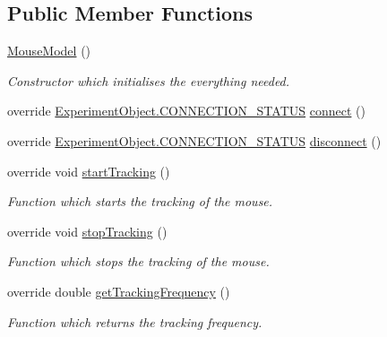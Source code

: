 \subsection*{Public Member Functions}
\begin{DoxyCompactItemize}
\item 
\hyperlink{class_web_analyzer_1_1_test_1_1_communication_1_1_mouse_model_ad84f4a65000f2e03f7003546d5e63dd2}{Mouse\+Model} ()
\begin{DoxyCompactList}\small\item\em Constructor which initialises the everything needed. \end{DoxyCompactList}\item 
override \hyperlink{class_web_analyzer_1_1_u_i_1_1_interaction_objects_1_1_experiment_object_a2875208b4f4b0ed643593152f4ec025c}{Experiment\+Object.\+C\+O\+N\+N\+E\+C\+T\+I\+O\+N\+\_\+\+S\+T\+A\+T\+U\+S} \hyperlink{class_web_analyzer_1_1_test_1_1_communication_1_1_mouse_model_a147d911ce601efe3bf779cebaed106e9}{connect} ()
\item 
override \hyperlink{class_web_analyzer_1_1_u_i_1_1_interaction_objects_1_1_experiment_object_a2875208b4f4b0ed643593152f4ec025c}{Experiment\+Object.\+C\+O\+N\+N\+E\+C\+T\+I\+O\+N\+\_\+\+S\+T\+A\+T\+U\+S} \hyperlink{class_web_analyzer_1_1_test_1_1_communication_1_1_mouse_model_a7928a4615bb62b6e4b273340bd224554}{disconnect} ()
\item 
override void \hyperlink{class_web_analyzer_1_1_test_1_1_communication_1_1_mouse_model_ad2d20d7f2f302ef22e40da86a18dcaf9}{start\+Tracking} ()
\begin{DoxyCompactList}\small\item\em Function which starts the tracking of the mouse. \end{DoxyCompactList}\item 
override void \hyperlink{class_web_analyzer_1_1_test_1_1_communication_1_1_mouse_model_a025e9d3e6918ebe7b6a1fd1ccf019b8a}{stop\+Tracking} ()
\begin{DoxyCompactList}\small\item\em Function which stops the tracking of the mouse. \end{DoxyCompactList}\item 
override double \hyperlink{class_web_analyzer_1_1_test_1_1_communication_1_1_mouse_model_aa46691d72c894f0ba51943e37c8ce0a0}{get\+Tracking\+Frequency} ()
\begin{DoxyCompactList}\small\item\em Function which returns the tracking frequency. \end{DoxyCompactList}\end{DoxyCompactItemize}
